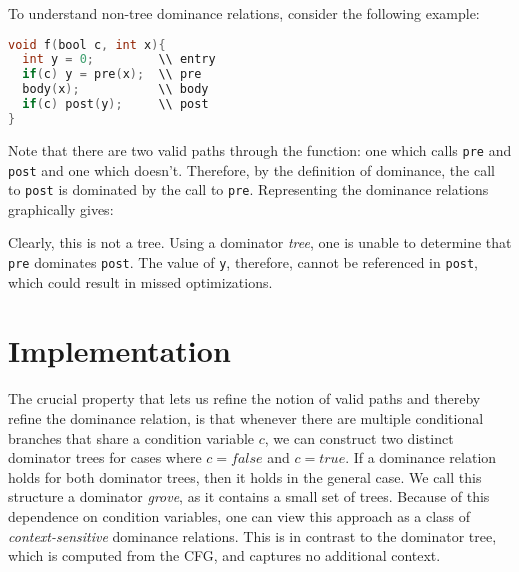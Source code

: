 \documentclass[a4paper,twocolumn]{article}
\begin{document}
To understand non-tree dominance relations, consider the following example: 
\begin{minipage}{\linewidth}
\begin{lstlisting}[language=C]
void f(bool c, int x){
  int y = 0;         \\ entry
  if(c) y = pre(x);  \\ pre
  body(x);           \\ body	
  if(c) post(y);     \\ post
}
\end{lstlisting}
\end{minipage}
Note that there are two valid paths through the function: one which calls
\texttt{pre} and \texttt{post} and one which doesn't. Therefore, by the
definition of dominance, the call to \texttt{post} is dominated by the call to
\texttt{pre}. Representing the dominance relations graphically gives: 
\begin{center}
\end{center} 
Clearly, this is not a tree. Using a dominator \emph{tree}, one is unable
to determine that \texttt{pre} dominates \texttt{post}. The value of
\texttt{y}, therefore, cannot be referenced in \texttt{post}, which could 
result in missed optimizations.

\section*{Implementation}
The crucial property that lets us refine the notion of valid paths and
thereby refine the dominance relation, is that whenever there are multiple
conditional branches that share a condition variable $c$, we can construct
two distinct dominator trees for cases where $c=false$ and $c=true$. If a dominance
relation holds for both dominator trees, then it holds in the general case. We
call this structure a dominator \emph{grove}, as it contains a small set of
trees. Because of this dependence on condition variables, one can view this
approach as a class of \emph{context-sensitive} dominance relations. This is in
contrast to the dominator tree, which is computed from the CFG, and captures no
additional context.
\end{document}
